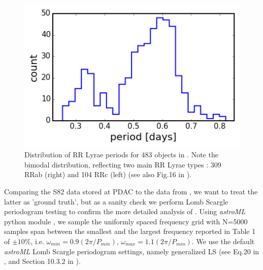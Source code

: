 \documentclass[fleqn,usenatbib]{mnras} %
\begin{document}
\begin{figure}
\includegraphics[width=\columnwidth]{figs/Fig_1_Sesar_2010_RRLyr}
\caption{ Distribution of RR Lyrae periods  for 483 objects in \citep{sesar2010}. Note the bimodal distribution, reflecting two main RR Lyrae types : 309 RRab (right) and 104 RRc (left) (see also Fig.16 in \citep{sesar2010}).}
\label{fig:RRLyr_distribution}
\end{figure}


Comparing the S82 data stored at PDAC to the data from \cite{sesar2010},  we want to treat the latter as 'ground truth', but as a sanity check we perform Lomb Scargle periodogram testing to confirm the more detailed analysis of \cite{sesar2010}. Using {\it astroML} python module \citep{astroML}, we sample the uniformly spaced frequency grid with N=5000 samples span between the smallest and the largest frequency reported in Table 1 of \cite{sesar2010} $\pm 10\%$, i.e. $\omega_{min} = 0.9 ( 2 \pi / P_{min})$, $\omega_{max} = 1.1 ( 2 \pi / P_{min})$. We use the default {\it astroML} Lomb Scargle periodogram settings, namely generalized LS (see Eq.20 in \cite{zechmeister2009}, and Section 10.3.2 in \cite{ivezic2014}).   
\end{document}
